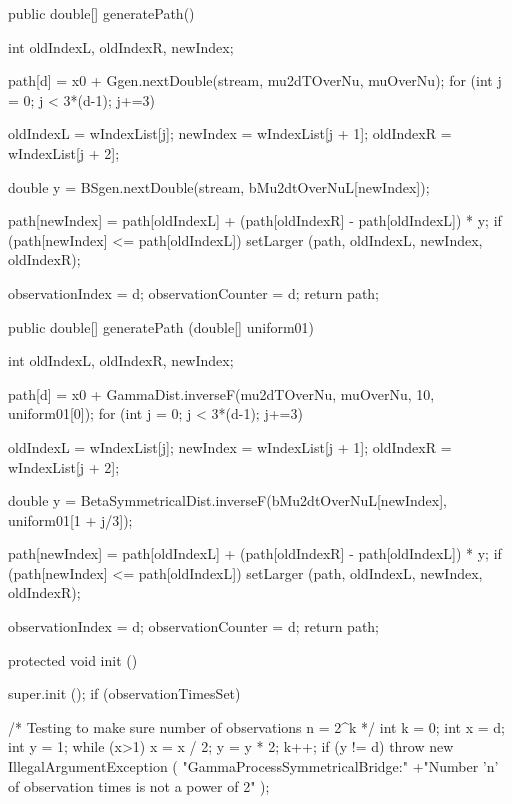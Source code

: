 \begin{code}
\begin{hide}
    public double[] generatePath() {
        int oldIndexL, oldIndexR, newIndex;

        path[d] = x0 + Ggen.nextDouble(stream, mu2dTOverNu, muOverNu);
        for (int j = 0; j < 3*(d-1); j+=3) {
            oldIndexL   = wIndexList[j];
            newIndex    = wIndexList[j + 1];
            oldIndexR   = wIndexList[j + 2];

            double y =  BSgen.nextDouble(stream, bMu2dtOverNuL[newIndex]);

            path[newIndex] = path[oldIndexL] +
              (path[oldIndexR] - path[oldIndexL]) * y;
            if (path[newIndex] <= path[oldIndexL])
                setLarger (path, oldIndexL, newIndex, oldIndexR);
        }
        observationIndex   = d;
        observationCounter = d;
        return path;
    }

    public double[] generatePath (double[] uniform01) {
        int oldIndexL, oldIndexR, newIndex;

        path[d] = x0 + GammaDist.inverseF(mu2dTOverNu, muOverNu, 10, uniform01[0]);
        for (int j = 0; j < 3*(d-1); j+=3) {
            oldIndexL   = wIndexList[j];
            newIndex    = wIndexList[j + 1];
            oldIndexR   = wIndexList[j + 2];

            double y =  BetaSymmetricalDist.inverseF(bMu2dtOverNuL[newIndex], uniform01[1 + j/3]);

            path[newIndex] = path[oldIndexL] +
              (path[oldIndexR] - path[oldIndexL]) * y;
           if (path[newIndex] <= path[oldIndexL])
               setLarger (path, oldIndexL, newIndex, oldIndexR);
        }
        observationIndex   = d;
        observationCounter = d;
        return path;
    }

    protected void init () {
        super.init ();
        if (observationTimesSet) {

            /* Testing to make sure number of observations n = 2^k */
            int k = 0;
            int x = d;
            int y = 1;
            while (x>1) {
            x = x / 2;
            y = y * 2;
            k++;
            }
            if (y != d) throw new IllegalArgumentException
            ( "GammaProcessSymmetricalBridge:"
                +"Number 'n' of observation times is not a power of 2" );

}}
\end{hide}
\end{code}
